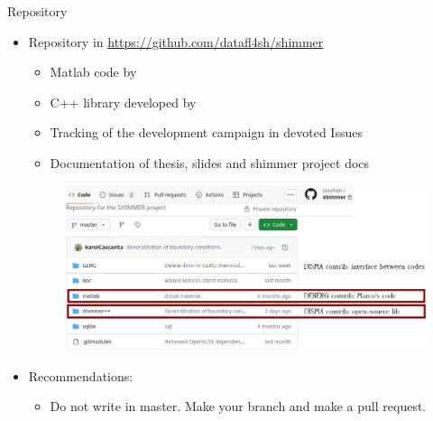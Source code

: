 \begin{frame}{Repository}
\begin{itemize}
    \item Repository in \url{https://github.com/datafl4sh/shimmer}
\begin{itemize}
    \item Matlab code by  
    \item C++ library developed by 
    \item Tracking of the development campaign in devoted Issues
    \item Documentation of thesis, slides and shimmer project docs
\end{itemize}
\begin{figure}
	\includegraphics[scale=0.35]{img_other/repo.jpg}
\end{figure}
\item Recommendations:
\begin{itemize}
    \item Do not write in master. Make your branch and make a pull request.
\end{itemize}    
\end{itemize}   
\end{frame}
